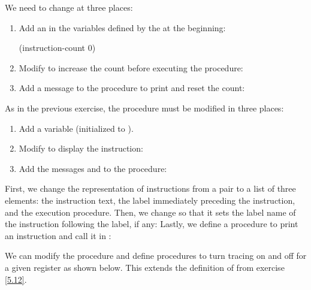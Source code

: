 \begin{exe}[5.15]
    We need to change  at three places:
    \begin{enumerate}[label=\arabic*.]
	\item Add an  in the variables defined by the 
	     at the beginning:
	    \begin{cscm}
		(instruction-count 0)
	    \end{cscm}

	\item Modify  to increase the count before executing the 
	    procedure:

	\item Add a message to the  procedure to print and reset 
	    the count:
    \end{enumerate}
\end{exe}

\begin{exe}[5.16]
    As in the previous exercise, the  procedure must be 
    modified in three places:
    \begin{enumerate}[label=\arabic*.]
	\item Add a  variable (initialized to ).
	\item Modify  to display the instruction:
	\item Add the messages  and  to the 
	     procedure:
    \end{enumerate}
\end{exe}

\begin{exe}[5.17]
    \label{5.17}
    First, we change the representation of instructions from a pair to a list of 
    three elements: the instruction text, the label immediately preceding the 
    instruction, and the execution procedure.
    Then, we change  so that it sets the label name of 
    the instruction following the label, if any:
    Lastly, we define a procedure to print an instruction and call it in 
    :
\end{exe}

\begin{exe}[5.18]
    We can modify the  procedure and define procedures to 
    turn tracing on and off for a given register as shown below. This extends 
    the definition of  from exercise \ref{5.12}.
\end{exe}

